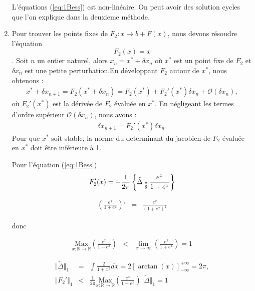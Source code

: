 \begin{enumerate}[label = Méthode \arabic*)]
		
		
		L'équations (\ref{eq:1Bess}) est non-linéaire. On peut avoir des solution cycles que l'on explique dans la deuxieme méthode.

		
	\item Pour trouver les points fixes de \(F_2: x \mapsto b + F(x)\), nous devons résoudre l'équation $$F_2(x) = x$$. Soit \(n\) un entier naturel, alors \(x_n = x^\ast + \delta x_n\) où \(x^\ast\) est un point fixe de \(F_2\) et \(\delta x_n\) est une petite perturbation.En développant \(F_2\) autour de \(x^\ast\), nous obtenons :
	\begin{eqnarray}
	x^\ast + \delta x_{n+1} = F_2(x^\ast + \delta x_n) = F_2(x^\ast) + F_2'(x^\ast)\delta x_n + \mathcal{O}(\delta x_n),
	\end{eqnarray}
	où \(F_2'(x^\ast)\) est la dérivée de \(F_2\) évaluée en \(x^\ast\). En négligeant les termes d'ordre supérieur \(\mathcal{O}(\delta x_n)\), nous avons :
	\begin{eqnarray}
		\delta x_{n+1} = F_2'(x^\ast)\delta x_n.
	\end{eqnarray}
	Pour que \(x^\ast\) soit stable, la norme du determinant du jacobien de \(F_2\) évaluée en \(x^\ast\) doit être inférieure à 1.
	
	Pour l'équation (\ref{eq:1Bess}) 
	\begin{eqnarray} 
		F_2' ( x ) =   - \frac{1}{2 \pi}\left \{ \tilde{\Delta} \underset{\tiny \tilde{\theta}}{\star} \frac{ e^x }{ 1 + e^{x} } \right \} 
	\end{eqnarray}
	
	\begin{eqnarray}
		\left ( \frac{ e^x }{ 1 + e^{x} } \right )' 	& = & \frac{ e^x }{ (1 + e^{x})^2 }     
	\end{eqnarray}
	
	donc 
	
	\begin{eqnarray}
		\underset{x \colon \mathbb{R} \to \mathbb{R} }{\mbox{Max}}\left ( \frac{ e^x }{ 1 + e^{x} } \right ) 	& < & \underset{ x \to \infty}{ \lim}  \left ( \frac{ e^x }{ 1 + e^{x} } \right ) = 1    
	\end{eqnarray}


	\begin{eqnarray}
		\Vert \tilde{\Delta} \Vert_1  & = & \int \frac{2}{1 + x^2 } dx = 2 \left [ \arctan (x) \right ]_{-\infty}^{+ \infty} = 2 \pi , \\
		\Vert F_2' \Vert_1 & < &  \frac{1}{2\pi} \underset{x \colon \mathbb{R} \to \mathbb{R} }{\mbox{Max}}\left ( \frac{ e^x }{ 1 + e^{x} } \right )  \Vert \tilde{\Delta} \Vert_1  = 1 
	\end{eqnarray}
	

\end{enumerate}
